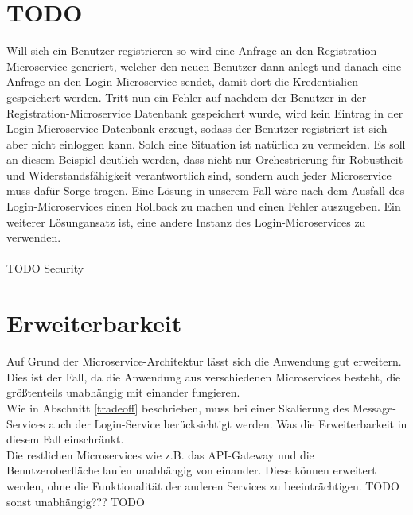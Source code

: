 \section{TODO}
Will sich ein Benutzer registrieren so wird eine Anfrage an den Registration-Microservice generiert, welcher den neuen Benutzer dann anlegt und danach eine Anfrage an den Login-Microservice sendet, damit dort die Kredentialien gespeichert werden. Tritt nun ein Fehler auf nachdem der Benutzer in der Registration-Microservice Datenbank gespeichert wurde, wird kein Eintrag in der Login-Microservice Datenbank erzeugt, sodass der Benutzer registriert ist sich aber nicht einloggen kann. Solch eine Situation ist natürlich zu vermeiden. Es soll an diesem Beispiel deutlich werden, dass nicht nur Orchestrierung für Robustheit und Widerstandsfähigkeit verantwortlich sind, sondern auch jeder Microservice muss dafür Sorge tragen. Eine Lösung in unserem Fall wäre nach dem Ausfall des Login-Microservices einen Rollback zu machen und einen Fehler auszugeben. Ein weiterer Lösungansatz ist, eine andere Instanz des Login-Microservices zu verwenden.\\
\\
TODO Security

\section{Erweiterbarkeit}
Auf Grund der Microservice-Architektur lässt sich die Anwendung gut erweitern. Dies ist der Fall, da die Anwendung aus verschiedenen Microservices besteht, die größtenteils unabhängig mit einander fungieren.\\
Wie in Abschnitt \ref{tradeoff} beschrieben, muss bei einer Skalierung des Message-Services auch der Login-Service berücksichtigt werden. Was die Erweiterbarkeit in diesem Fall einschränkt.\\
Die restlichen Microservices wie z.B. das API-Gateway und die Benutzeroberfläche laufen unabhängig von einander. Diese können erweitert werden, ohne die Funktionalität der anderen Services zu beeinträchtigen.
TODO sonst unabhängig??? TODO